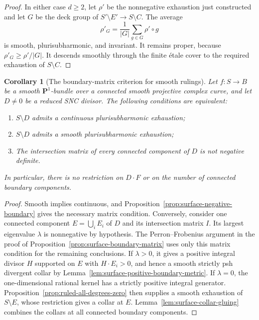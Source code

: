 \documentclass[11pt]{amsart}
\newtheorem{corollary}[theorem]{Corollary}
\theoremstyle{definition}
\theoremstyle{remark}
\numberwithin{equation}{section}
\newcommand{\PP}{\mathbf P}
\begin{document}
\begin{proof}
In either case $d\ge2$, let $\rho'$ be the nonnegative exhaustion just
constructed and let $G$ be the deck group of $S'\setminus E'\to S\setminus C$.
The average
\[
 \rho'_G=\frac1{|G|}\sum_{g\in G}\rho'\circ g
\]
is smooth, plurisubharmonic, and invariant. It remains proper, because
$\rho'_G\ge\rho'/|G|$. It descends smoothly through the finite \'etale
cover to the required exhaustion of $S\setminus C$.
\end{proof}

\begin{corollary}[The boundary-matrix criterion for smooth rulings]
\label{cor:ruled-all-degrees}
Let $f:S\to B$ be a smooth $\PP^1$-bundle over a connected smooth
projective complex curve, and let $D\ne0$ be a reduced SNC divisor.
The following conditions are equivalent:
\begin{enumerate}[label=\textup{(\roman*)},leftmargin=2.5em]
\item $S\setminus D$ admits a continuous plurisubharmonic exhaustion;
\item $S\setminus D$ admits a smooth plurisubharmonic exhaustion;
\item The intersection matrix of every connected component of $D$ is
not negative definite.
\end{enumerate}
In particular, there is no restriction on $D\cdot F$ or on the number
of connected boundary components.
\end{corollary}

\begin{proof}
Smooth implies continuous, and
Proposition~\ref{prop:surface-negative-boundary} gives the necessary
matrix condition. Conversely, consider one connected component
$E=\bigcup_i E_i$ of $D$ and its intersection matrix $I$. Its largest
eigenvalue $\lambda$ is nonnegative by hypothesis. The
Perron--Frobenius argument in the proof of
Proposition~\ref{prop:surface-boundary-matrix} uses only this matrix
condition for the remaining conclusions. If $\lambda>0$, it gives a
positive integral divisor $H$ supported on $E$ with $H\cdot E_i>0$,
and hence a smooth strictly psh divergent collar by
Lemma~\ref{lem:surface-positive-boundary-metric}. If $\lambda=0$,
the one-dimensional rational kernel has a strictly positive integral
generator. Proposition~\ref{prop:ruled-all-degrees-zero} then supplies
a smooth exhaustion of $S\setminus E$, whose restriction gives a
collar at $E$. Lemma~\ref{lem:surface-collar-gluing} combines the
collars at all connected boundary components.
\end{proof}
\end{document}
